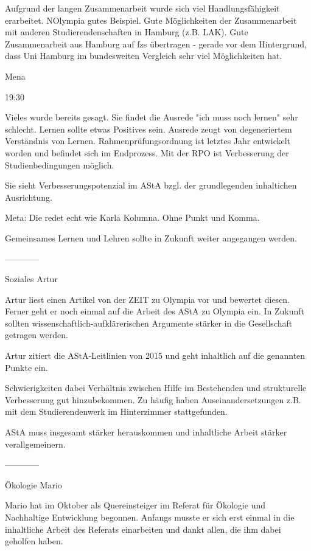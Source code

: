 \documentclass[ngerman,headheight=70pt]{scrartcl}
\begin{document}
    Aufgrund der langen Zusammenarbeit wurde sich viel Handlungsfähigkeit
    erarbeitet. NOlympia gutes Beispiel. Gute Möglichkeiten der Zusammenarbeit
    mit anderen Studierendenschaften in Hamburg (z.B. LAK).
    Gute Zusammenarbeit aus Hamburg auf fzs übertragen - gerade vor dem Hintergrund,
    dass Uni Hamburg im bundesweiten Vergleich sehr viel Möglichkeiten hat.

    Mena

    19:30

    Vieles wurde bereits gesagt. Sie findet die Ausrede "ich muss noch lernen"
    sehr schlecht. Lernen sollte etwas Positives sein. Ausrede zeugt von
    degeneriertem Verständnis von Lernen. Rahmenprüfungsordnung ist letztes
    Jahr entwickelt worden und befindet sich im Endprozess. Mit der RPO
    ist Verbesserung der Studienbedingungen möglich.

    Sie sieht Verbesserungspotenzial im AStA bzgl. der grundlegenden inhaltichen
    Ausrichtung.

    Meta: Die redet echt wie Karla Kolumna. Ohne Punkt und Komma.

    Gemeinsames Lernen und Lehren sollte in Zukunft weiter angegangen werden.

    ------------

    Soziales
    Artur

    Artur liest einen Artikel von der ZEIT zu Olympia vor und bewertet diesen.
    Ferner geht er noch einmal auf die Arbeit des AStA zu Olympia ein.
    In Zukunft sollten wissenschaftlich-aufklärerischen Argumente stärker
    in die Gesellschaft getragen werden.

    Artur zitiert die AStA-Leitlinien von 2015 und geht inhaltlich auf die
    genannten Punkte ein.

    Schwierigkeiten dabei Verhältnis zwischen Hilfe im Bestehenden und
    strukturelle Verbesserung gut hinzubekommen. Zu häufig haben Auseinandersetzungen
    z.B. mit dem Studierendenwerk im Hinterzimmer stattgefunden.

    AStA muss insgesamt stärker herauskommen und inhaltliche Arbeit stärker
    verallgemeinern.

    ------------

    Ökologie
    Mario

    Mario hat im Oktober als Quereinsteiger im Referat für Ökologie und
    Nachhaltige Entwicklung begonnen. Anfangs musste er sich erst einmal
    in die inhaltliche Arbeit des Referats einarbeiten und dankt allen,
    die ihm dabei geholfen haben.
\end{document}
